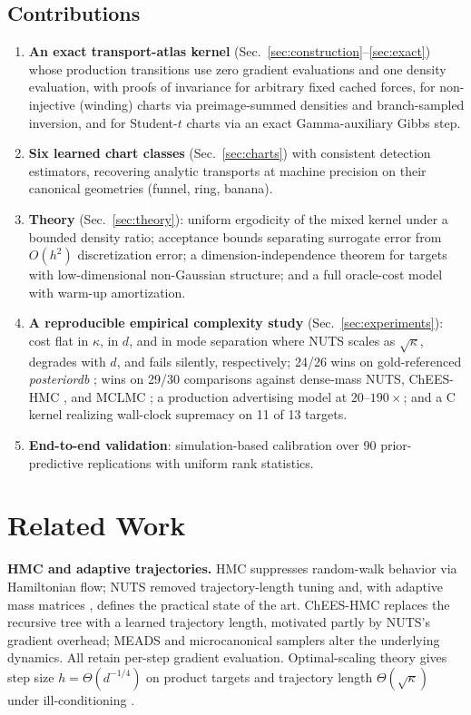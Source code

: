 \documentclass[10pt,journal,compsoc]{IEEEtran}
\begin{document}
\subsection{Contributions}
\begin{enumerate}
\item \textbf{An exact transport-atlas kernel} (Sec.~\ref{sec:construction}--\ref{sec:exact})
  whose production transitions use zero gradient evaluations and one density
  evaluation, with proofs of invariance for arbitrary fixed cached forces,
  for non-injective (winding) charts via preimage-summed densities and
  branch-sampled inversion, and for Student-$t$ charts via an exact
  Gamma-auxiliary Gibbs step.
\item \textbf{Six learned chart classes} (Sec.~\ref{sec:charts}) with
  consistent detection estimators, recovering analytic transports at machine
  precision on their canonical geometries (funnel, ring, banana).
\item \textbf{Theory} (Sec.~\ref{sec:theory}): uniform ergodicity of the
  mixed kernel under a bounded density ratio; acceptance bounds separating
  surrogate error from $O(h^2)$ discretization error; a
  dimension-independence theorem for targets with low-dimensional
  non-Gaussian structure; and a full oracle-cost model with warm-up
  amortization.
\item \textbf{A reproducible empirical complexity study}
  (Sec.~\ref{sec:experiments}): cost flat in $\kappa$, in $d$, and in mode
  separation where NUTS scales as $\sqrt\kappa$, degrades with $d$, and
  fails silently, respectively; 24/26 wins on gold-referenced
  \emph{posteriordb} \cite{magnusson2024}; wins on 29/30 comparisons against
  dense-mass NUTS, ChEES-HMC \cite{hoffman2021}, and MCLMC
  \cite{robnik2023}; a production advertising model at $20$--$190\times$;
  and a C kernel realizing wall-clock supremacy on 11 of 13 targets.
\item \textbf{End-to-end validation}: simulation-based calibration
  \cite{talts2018} over 90 prior-predictive replications with uniform rank
  statistics.
\end{enumerate}

\section{Related Work}\label{sec:related}
\textbf{HMC and adaptive trajectories.} HMC \cite{duane1987,neal2011}
suppresses random-walk behavior via Hamiltonian flow; NUTS \cite{hoffman2014}
removed trajectory-length tuning and, with adaptive mass matrices
\cite{stan2017}, defines the practical state of the art. ChEES-HMC
\cite{hoffman2021} replaces the recursive tree with a learned trajectory
length, motivated partly by NUTS's gradient overhead; MEADS
\cite{hoffman2022} and microcanonical samplers \cite{robnik2023,robnik2024}
alter the underlying dynamics. All retain per-step gradient evaluation.
Optimal-scaling theory gives step size $h=\Theta(d^{-1/4})$ on product
targets \cite{beskos2013} and trajectory length $\Theta(\sqrt\kappa)$
under ill-conditioning \cite{neal2011,langmore2019}.
\end{document}
